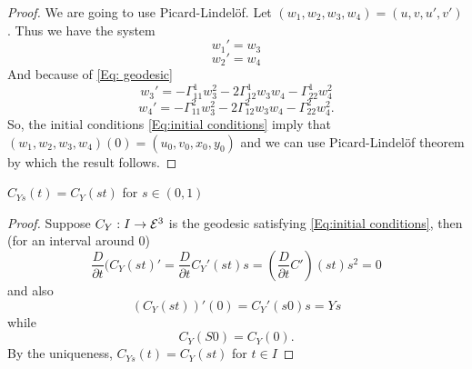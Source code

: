 \begin{proof}
	
	We are going to use Picard-Lindelöf.
	Let $ (w_1,w_2,w_3,w_4) = (u,v,u',v') $. Thus we have the system
		\[ w_1' = w_3 \]
		\[ w_2' = w_4 \]
		And because of \ref{Eq: geodesic}
		\[ w_3' = -\Gamma_{11}^1w_3^2 - 2 \Gamma_{12}^1 w_3w_4 -\Gamma_{22}^1 w_4^2 \]
		\[ w_4' = -\Gamma_{11}^2w_3^2 - 2 \Gamma_{12}^2 w_3w_4 -\Gamma_{22}^2 w_4^2. \]
		So, the initial conditions \ref{Eq:initial conditions} imply that $ (w_1,w_2,w_3,w_4)(0) = (u_0,v_0,x_0,y_0) $ and we can use Picard-Lindelöf theorem by which the result follows.
	
\end{proof}

\begin{lemma}
	
	$ C_{Ys}(t) = C_Y(st) $ for $ s \in (0,1) $
	
\end{lemma}

\begin{proof}
	
	Suppose $ C_Y: I \rightarrow \mathcal E^3 $ is the geodesic satisfying \ref{Eq:initial conditions}, then (for an interval around $ 0 $)
		\[ \dfrac{D}{\partial t} (C_Y(st)' = \dfrac{D}{\partial t} C_Y'(st)s = (\dfrac{D}{\partial t} C') (st)s^2 = 0 \] 
	and also
		\[ (C_Y(st))'(0) = C_Y'(s0)s = Ys \]
	while
		\[ C_Y(S0) = C_Y(0). \]
	By the uniqueness, $ C_{Ys}(t) = C_Y(st) $ for $ t \in I $
\end{proof}
